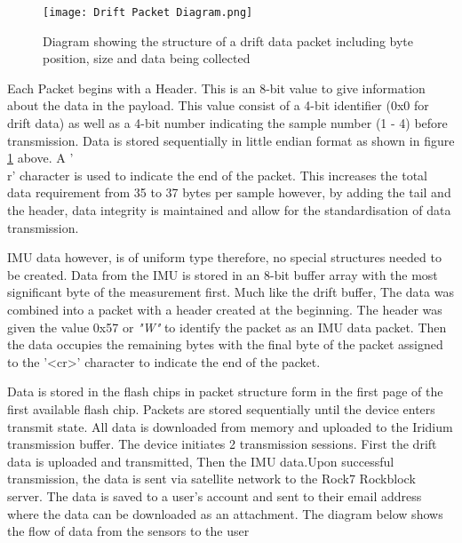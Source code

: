 \begin{figure}[H]
    \centering
    \texttt{[image: Drift Packet Diagram.png]}
    \caption{Diagram showing the structure of a drift data packet including byte position, size and data being collected}
    \label{fig:packet_structure}
\end{figure}

Each Packet begins with a Header. This is an 8-bit value to give information about the data in the payload. This value consist of a 4-bit identifier (0x0 for drift data) as well as a 4-bit number indicating the sample number (1 - 4) before transmission. Data is stored sequentially in little endian format as shown in figure \ref{fig:packet_structure} above. A '\\r' character is used to indicate the end of the packet. This increases the total data requirement from 35 to 37 bytes per sample however, by adding the tail and the header, data integrity is maintained and allow for the standardisation of data transmission.\par  

IMU data however, is of uniform type therefore, no special structures needed to be created. Data from the IMU is stored in an 8-bit buffer array with the most significant byte of the measurement first. Much like the drift buffer, The data was combined into a packet with a header created at the beginning. The header was given the value 0x57 or \textit{"W"} to identify the packet as an IMU data packet. Then the data occupies the remaining bytes with the final byte of the packet assigned to the '<cr>' character to indicate the end of the packet. \par 

Data is stored in the flash chips in packet structure form in the first page of the first available flash chip. Packets are stored sequentially until the device enters transmit state. All data is downloaded from memory and uploaded to the Iridium transmission buffer. The device initiates 2 transmission sessions. First the drift data is uploaded and transmitted, Then the IMU data.Upon successful transmission, the data is sent via satellite network to the Rock7 Rockblock server. The data is saved to a user's account and sent to their email address where the data can be downloaded as an attachment. The diagram below shows the flow of data from the sensors to the user 

